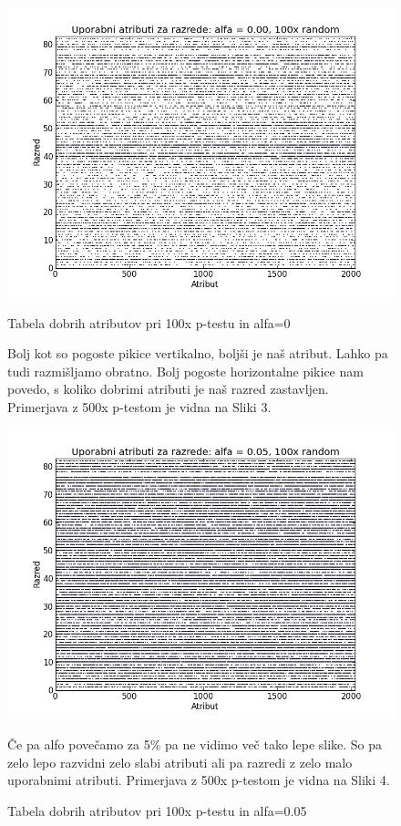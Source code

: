 \documentclass[a4paper,11pt]{article}
\begin{document}
\begin{figure}
\begin{center}
\includegraphics[scale=0.5]{3.png}
\caption{Tabela dobrih atributov pri 100x p-testu in alfa=0}
\end{center}
Bolj kot so pogoste pikice vertikalno, boljši je naš atribut. Lahko pa tudi razmišljamo obratno. Bolj pogoste horizontalne pikice nam povedo, s koliko dobrimi atributi je naš razred zastavljen. Primerjava z 500x p-testom je vidna na Sliki 3.
\begin{center}
\includegraphics[scale=0.5]{4.png}
\caption{Tabela dobrih atributov pri 100x p-testu in alfa=0.05}
\end{center}
Če pa alfo povečamo za 5\% pa ne vidimo več tako lepe slike. So pa zelo lepo razvidni zelo slabi atributi ali pa razredi z zelo malo uporabnimi atributi. Primerjava z 500x p-testom je vidna na Sliki 4.
\end{figure}
\end{document}
